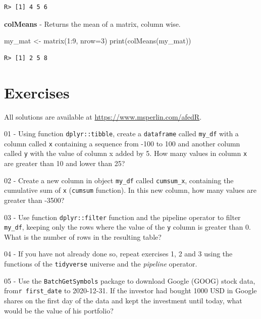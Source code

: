 \documentclass[
  12pt,
]{book}
\newenvironment{Shaded}{\begin{snugshade}}{\end{snugshade}}
\newcommand{\AttributeTok}[1]{\textcolor[rgb]{0.61,0.61,0.61}{#1}}
\newcommand{\DecValTok}[1]{\textcolor[rgb]{0.06,0.06,0.06}{#1}}
\newcommand{\FunctionTok}[1]{\textcolor[rgb]{0,0,0}{#1}}
\newcommand{\NormalTok}[1]{#1}
\newcommand{\OtherTok}[1]{\textcolor[rgb]{0.37,0.37,0.37}{#1}}
\newcommand{\SpecialCharTok}[1]{\textcolor[rgb]{0,0,0}{#1}}
\begin{document}
\begin{verbatim}
R> [1] 4 5 6
\end{verbatim}

\textbf{colMeans} - Returns the mean of a matrix, column wise. 

\begin{Shaded}
\begin{Highlighting}[]
\NormalTok{my\_mat }\OtherTok{\textless{}{-}} \FunctionTok{matrix}\NormalTok{(}\DecValTok{1}\SpecialCharTok{:}\DecValTok{9}\NormalTok{, }\AttributeTok{nrow=}\DecValTok{3}\NormalTok{)}
\FunctionTok{print}\NormalTok{(}\FunctionTok{colMeans}\NormalTok{(my\_mat))}
\end{Highlighting}
\end{Shaded}

\begin{verbatim}
R> [1] 2 5 8
\end{verbatim}

\hypertarget{exercises-3}{%
\section{Exercises}\label{exercises-3}}

All solutions are available at \url{https://www.msperlin.com/afedR}.

01 -
Using function \texttt{dplyr::tibble}, create a \texttt{dataframe} called \texttt{my\_df} with a column called \texttt{x} containing a sequence from -100 to 100 and another column called \texttt{y} with the value of column x added by 5. How many values in column \texttt{x} are greater than 10 and lower than 25?

02 -
Create a new column in object \texttt{my\_df} called \texttt{cumsum\_x}, containing the cumulative sum of \texttt{x} (\texttt{cumsum} function). In this new column, how many values are greater than -3500?

03 -
Use function \texttt{dplyr::filter} function and the pipeline operator to filter \texttt{my\_df}, keeping only the rows where the value of the \texttt{y} column is greater than 0. What is the number of rows in the resulting table?

04 -
If you have not already done so, repeat exercises 1, 2 and 3 using the functions of the \texttt{tidyverse} universe and the \emph{pipeline} operator.

05 -
Use the \texttt{BatchGetSymbols} package to download Google (GOOG) stock data, from\texttt{r\ first\_date} to 2020-12-31. If the investor had bought 1000 USD in Google shares on the first day of the data and kept the investment until today, what would be the value of his portfolio?
\end{document}
